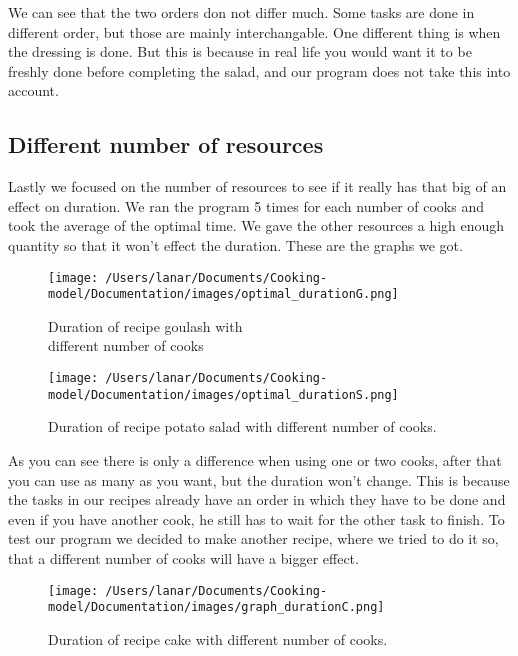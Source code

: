 We can see that the two orders don not differ much. Some tasks are done in different order, but those are mainly interchangable. One different thing is when the dressing is done. 
But this is because in real life you would want it to be freshly done before completing the salad, and our program does not take this into account. 

\subsection{Different number of resources}
Lastly we focused on the number of resources to see if it really has that big of an effect on duration. 
We ran the program 5 times for each number of cooks and took the average of the optimal time. We gave the other resources a high enough quantity so that it won't effect the duration.
These are the graphs we got.

\begin{figure}[H]
    \centering
    \begin{minipage}{.5\textwidth}
      \centering
      \texttt{[image: /Users/lanar/Documents/Cooking-model/Documentation/images/optimal\_durationG.png]}
      \caption{Duration of recipe goulash with \\ different number of cooks}
      \label{fig6}
    \end{minipage}%
    \begin{minipage}{.5\textwidth}
      \centering
      \texttt{[image: /Users/lanar/Documents/Cooking-model/Documentation/images/optimal\_durationS.png]}
      \caption{Duration of recipe potato salad with different number of cooks.}
      \label{fig7}
    \end{minipage}
\end{figure}

As you can see there is only a difference when using one or two cooks, after that you can use as many as you want, but the duration won't change. 
This is because the tasks in our recipes already have an order in which they have to be done and even if you have another cook, he still has to wait for the other task to finish. 
To test our program we decided to make another recipe, where we tried to do it so, that a different number of cooks will have a bigger effect.

\begin{figure}[H]
    \centerline{\texttt{[image: /Users/lanar/Documents/Cooking-model/Documentation/images/graph\_durationC.png]}}
    \caption{Duration of recipe cake with different number of cooks.}
    \label{fig8}
\end{figure}

